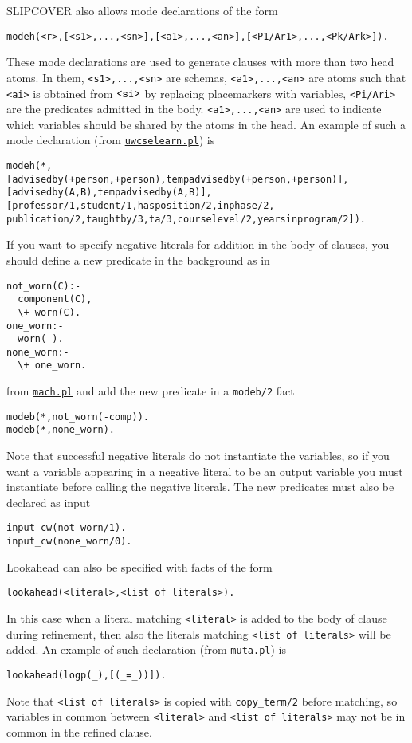 SLIPCOVER also allows mode declarations of the form
\begin{verbatim}
modeh(<r>,[<s1>,...,<sn>],[<a1>,...,<an>],[<P1/Ar1>,...,<Pk/Ark>]). 
\end{verbatim}
These mode declarations are used to generate clauses with more than two head atoms. In them, \verb|<s1>,...,<sn>| are schemas,  \verb|<a1>,...,<an>| are atoms such that \verb|<ai>| is obtained from $\verb|<si>|$ by replacing placemarkers with variables, 
\verb|<Pi/Ari>| are the predicates admitted in the body. \verb|<a1>,...,<an>| are used to indicate which variables should be shared by the atoms in the head.
An example of such a mode declaration (from \href{http://cplint.lamping.unife.it/example/uwcselearn.pl}{\texttt{uwcselearn.pl}}) is
\begin{verbatim}
modeh(*,
[advisedby(+person,+person),tempadvisedby(+person,+person)],
[advisedby(A,B),tempadvisedby(A,B)],
[professor/1,student/1,hasposition/2,inphase/2,
publication/2,taughtby/3,ta/3,courselevel/2,yearsinprogram/2]).
\end{verbatim}
%
If you want to specify negative literals for addition in the body of clauses,
you should define a new predicate in the background as in
\begin{verbatim}
not_worn(C):-
  component(C),
  \+ worn(C).
one_worn:-
  worn(_).
none_worn:-
  \+ one_worn.
\end{verbatim}
from \href{http://cplint.lamping.unife.it/example/mach.pl}{\texttt{mach.pl}} and add the new predicate in a \verb|modeb/2| fact
\begin{verbatim}
modeb(*,not_worn(-comp)).
modeb(*,none_worn).
\end{verbatim}
Note that successful negative literals do not instantiate the variables, so if you want
a variable appearing in a negative literal to be an output variable you must instantiate 
before calling the negative literals.
The new predicates must also be declared as input
\begin{verbatim}
input_cw(not_worn/1).
input_cw(none_worn/0).
\end{verbatim}
Lookahead can also be specified with facts of the form
\begin{verbatim}
lookahead(<literal>,<list of literals>).
\end{verbatim}
In this case when a literal matching \verb|<literal>| is added to the body of clause during refinement, then also
the literals matching \verb|<list of literals>| will be added.
An example of such declaration (from \href{http://cplint.lamping.unife.it/example/muta.pl}{\texttt{muta.pl}}) is
\begin{verbatim}
lookahead(logp(_),[(_=_))]).
\end{verbatim}
Note that
\verb|<list of literals>| is copied with \verb|copy_term/2| before matching, so
variables in common between \verb|<literal>| and \verb|<list of literals>|
may not be in common in the refined clause.

